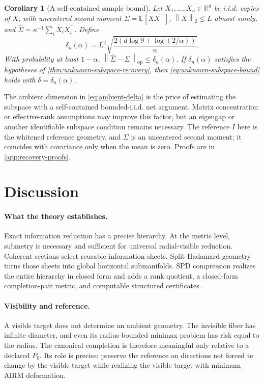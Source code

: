 \documentclass[10pt]{article}
\theoremstyle{plain}
\newtheorem{corollary}[theorem]{Corollary}
\theoremstyle{definition}
\theoremstyle{remark}
\newcommand{\R}{\mathbb R}
\newcommand{\E}{\mathbb E}
\newcommand{\opnorm}[1]{\left\lVert #1\right\rVert_{\operatorname{op}}}
\newcommand{\norm}[1]{\left\lVert #1\right\rVert}
\newcommand{\Sigmahat}{\widehat\Sigma}
\begin{document}
\begin{corollary}[A self-contained sample bound]
\label{cor:unknown-subspace-sample}
Let \(X_1,\ldots,X_n\in\R^d\) be i.i.d. copies of \(X\), with uncentered
second moment \(\Sigma=\E[XX^\top]\), \(\norm X_2\le L\) almost surely,
and
\(\Sigmahat=n^{-1}\sum_iX_iX_i^\top\).  Define
\begin{equation}
  \delta_n(\alpha)
  =L^2\sqrt{\frac{2(d\log9+\log(2/\alpha))}{n}}.
  \label{eq:ambient-delta}
\end{equation}
With probability at least \(1-\alpha\),
\(\opnorm{\Sigmahat-\Sigma}\le\delta_n(\alpha)\).  If
\(\delta_n(\alpha)\) satisfies the hypotheses of
\cref{thm:unknown-subspace-recovery}, then
\eqref{eq:unknown-subspace-bound} holds with
\(\delta=\delta_n(\alpha)\).
\end{corollary}

The ambient dimension in \eqref{eq:ambient-delta} is the price of estimating
the subspace with a self-contained bounded-i.i.d. net argument.  Matrix
concentration or effective-rank assumptions may improve this factor, but an
eigengap or another identifiable subspace condition remains necessary.  The
reference \(I\) here is the whitened reference geometry, and \(\Sigma\) is an
uncentered second moment; it coincides with covariance only when the mean is
zero.  Proofs are in
\cref{app:recovery-proofs}.

\section{Discussion}
\label{sec:discussion}

\paragraph{What the theory establishes.}
Exact information reduction has a precise hierarchy.  At the metric level,
submetry is necessary and sufficient for universal radial-visible reduction.
Coherent sections select reusable information sheets.  Split-Hadamard
geometry turns those sheets into global horizontal submanifolds.  SPD
compression realizes the entire hierarchy in closed form and adds a rank
quotient, a closed-form completion-pair metric, and computable structured
certificates.

\paragraph{Visibility and reference.}
A visible target does not determine an ambient geometry.  The invisible fiber
has infinite diameter, and even its radius-bounded minimax problem has risk
equal to the radius.  The canonical completion is therefore meaningful only
relative to a declared \(P_0\).  Its role is precise: preserve the reference
on directions not forced to change by the visible target while realizing the
visible target with minimum AIRM deformation.
\end{document}
